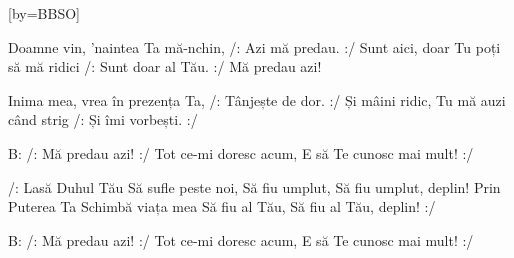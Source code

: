 [by={BBSO}]

\beginverse
Doamne vin, 'naintea Ta mă-nchin,
/: Azi mă predau. :/
Sunt aici, doar Tu poți să mă ridici
/: Sunt doar al Tău. :/
Mă predau azi!
\endverse

\beginverse
Inima mea, vrea în prezența Ta,
/: Tânjește de dor. :/
Și mâini ridic, Tu mă auzi când strig
/: Și îmi vorbești. :/
\endverse

\beginverse
B: /: Mă predau azi! :/ Tot ce-mi doresc acum,
E să Te cunosc mai mult! :/
\endverse

\beginchorus
/: Lasă Duhul Tău
Să sufle peste noi,
Să fiu umplut,
Să fiu umplut, deplin!
Prin Puterea Ta
Schimbă viața mea
Să fiu al Tău,
Să fiu al Tău, deplin! :/
\endchorus

\beginverse
B: /: Mă predau azi! :/ Tot ce-mi doresc acum,
E să Te cunosc mai mult! :/﻿
\endverse

\endsong